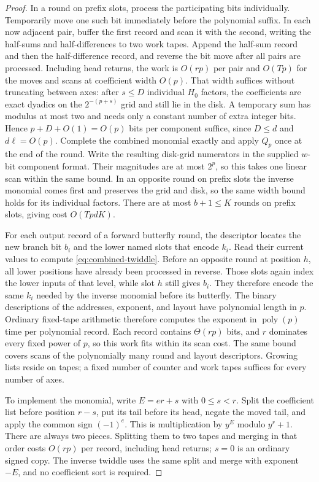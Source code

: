\documentclass[11pt]{article}
\theoremstyle{definition}
\begin{document}
\begin{proof}
In a round on prefix slots, process the participating bits individually.
Temporarily move one such bit immediately before the polynomial
suffix.  In each now adjacent pair, buffer the first record and scan
it with the second, writing the half-sums and half-differences to two
work tapes.  Append the half-sum record and then the half-difference
record, and reverse the bit move after
all pairs are processed.  Including head returns, the work is
$O(rp)$ per pair and $O(Tp)$ for the moves and scans at coefficient
width $O(p)$.
That width suffices without truncating between axes: after $s\leq D$
individual $H_0$ factors, the coefficients are exact dyadics on the
$2^{-(p+s)}$ grid and still lie in the disk.  A temporary sum has
modulus at most two and needs only a constant number of extra integer
bits.  Hence
$p+D+O(1)=O(p)$ bits per component suffice, since $D\leq d$ and
$d\ell=O(p)$.  Complete the combined monomial exactly and apply
$Q_p$ once at the end of the round. Write the resulting disk-grid
numerators in the supplied $w$-bit component format. Their magnitudes
are at most $2^p$, so this takes one linear scan within the same bound.
In an opposite round on prefix slots the
inverse monomial comes first and preserves the grid and disk, so the
same width bound holds for its individual factors.  There are at
most $b+1\leq K$ rounds on prefix slots, giving cost $O(TpdK)$.

For each output record of a forward butterfly round, the descriptor
locates the new branch bit $b_i$ and the lower named slots that encode
$k_i$.  Read their current values to compute
\eqref{eq:combined-twiddle}.  Before an opposite round at position
$h$, all lower positions have already been processed in reverse.
Those slots again index the lower inputs of that level, while slot
$h$ still gives $b_i$.  They therefore encode the same $k_i$ needed
by the inverse monomial before its
butterfly.  The binary descriptions of the addresses, exponent, and
layout have polynomial length in $p$.  Ordinary
fixed-tape arithmetic therefore computes the exponent in
$\operatorname{poly}(p)$ time per polynomial record.  Each record
contains $\Theta(rp)$ bits, and $r$ dominates every fixed power of
$p$, so this work fits within its scan cost.  The same bound covers
scans of the polynomially many round and layout descriptors.
Growing lists reside on tapes; a fixed number of counter and work
tapes suffices for every number of axes.

To implement the monomial, write $E=er+s$ with $0\leq s<r$.
Split the coefficient list before position $r-s$, put its tail
before its head, negate the moved tail, and apply the common sign
$(-1)^e$.  This is multiplication by $y^E$ modulo $y^r+1$.
There are always two pieces.  Splitting them to two tapes and merging
in that order costs $O(rp)$ per record, including head returns;
$s=0$ is an ordinary signed copy.  The inverse twiddle uses the
same split and merge with exponent $-E$, and no coefficient sort is
required.


\end{proof}
\end{document}
